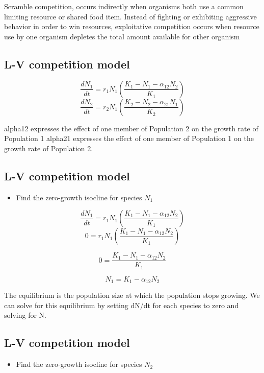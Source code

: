\documentclass[
  letterpaper,
  DIV=11,
  numbers=noendperiod]{scrartcl}
\providecommand{\tightlist}{%
  \setlength{\itemsep}{0pt}\setlength{\parskip}{0pt}}\usepackage{longtable,booktabs,array}
\begin{document}
Scramble competition, occurs indirectly when organisms both use a common
limiting resource or shared food item. Instead of fighting or exhibiting
aggressive behavior in order to win resources, exploitative competition
occurs when resource use by one organism depletes the total amount
available for other organism

\hypertarget{l-v-competition-model}{%
\subsection{L-V competition model}\label{l-v-competition-model}}

\[\frac{dN_1}{dt}=r_1N_1(\frac{K_1-N_1-\alpha_{12}N_2}{K_1})\]
\[\frac{dN_2}{dt}=r_2N_1(\frac{K_2-N_2-\alpha_{21}N_1}{K_2})\]

alpha12 expresses the effect of one member of Population 2 on the growth
rate of Population 1 alpha21 expresses the effect of one member of
Population 1 on the growth rate of Population 2.

\hypertarget{l-v-competition-model-1}{%
\subsection{L-V competition model}\label{l-v-competition-model-1}}

\begin{itemize}
\tightlist
\item
  Find the zero-growth isocline for species \(N_1\)
\end{itemize}

\[\frac{dN_1}{dt}=r_1N_1(\frac{K_1-N_1-\alpha_{12}N_2}{K_1})\]
\[0=r_1N_1(\frac{K_1-N_1-\alpha_{12}N_2}{K_1})\]

\[0=\frac{K_1-N_1-\alpha_{12}N_2}{K_1}\]

\[N_1=K_1-\alpha_{12}N_2\]

The equilibrium is the population size at which the population stops
growing. We can solve for this equilibrium by setting dN/dt for each
species to zero and solving for N.

\hypertarget{l-v-competition-model-2}{%
\subsection{L-V competition model}\label{l-v-competition-model-2}}

\begin{itemize}
\tightlist
\item
  Find the zero-growth isocline for species \(N_2\)
\end{itemize}
\end{document}
